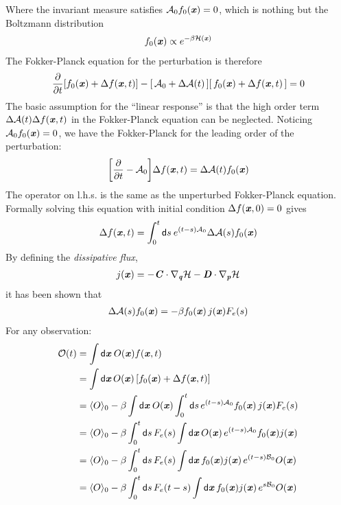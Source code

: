 \documentclass[aip,jcp,a4paper,reprint,onecolumn]{revtex4-1}
\newcommand{\vect}[1]{\textbf{\textit{#1}}}
\newcommand{\dd}{\textsf{d}}
\newcommand{\mh}{\mathcal H}
\newcommand{\fwg}{{\mathcal A}}
\newcommand{\bwg}{{\mathcal B}}
\begin{document}
Where the invariant measure satisfies $\fwg_0f_0(\vect x) = 0$,
which is nothing but the Boltzmann distribution
\begin{align}
  f_0(\vect x) \propto e^{-\beta\mh(\vect x)}
\end{align}
The Fokker-Planck equation for the perturbation is therefore
\begin{align}
  \frac{\partial}{\partial t}
  [f_0(\vect x) + \Delta  f(\vect x, t)]
  -
  [\,\fwg_0 + \Delta\fwg(t)\,]
  [\,f_0(\vect x) + \Delta  f(\vect x, t)\,] = 0
\end{align}
The basic assumption for the ``linear response'' is that the high order
term $\Delta\fwg(t)  \Delta  f(\vect x, t)$ in the Fokker-Planck equation
can be neglected. Noticing $\fwg_0 f_0(\vect x) = 0$, we have the
Fokker-Planck
for the leading order of the perturbation:
\begin{align}
  \bigg[
  \frac{\partial}{\partial t}
  - \fwg_0
  \bigg]
  \Delta  f(\vect x, t)
  =
  \Delta\fwg(t) f_0(\vect x)
\end{align}
The operator on l.h.s. is the same as the unperturbed Fokker-Planck equation.
Formally solving this equation with initial condition
$\Delta f(\vect x, 0) = 0$ gives
\begin{align}
  \Delta  f(\vect x, t) =
  \int_0^t \dd s \:
  e^{(t-s)\fwg_0}
  \Delta\fwg(s)f_0(\vect x)
\end{align}
By defining the \emph{dissipative flux},
\begin{align}
  j(\vect x) =
  -\vect C\cdot\nabla_{\vect q}\mh 
  -\vect D\cdot\nabla_{\vect p}\mh
\end{align}
it has been shown that %
\begin{align}
  \Delta\fwg(s)f_0(\vect x) =
  -\beta f_0(\vect x)\, j(\vect x) F_e(s)
\end{align}
For any observation:
\begin{align}\nonumber
  \mathcal O(t)
  &=
  \int\dd \vect x \:O(\vect x)f(\vect x, t)  \\\nonumber
  &=
  \int\dd \vect x\, O(\vect x)\,
  [f_0(\vect x) + \Delta f(\vect x, t)] \\\nonumber
  &=
  \langle O\rangle_0
  -
  \beta
  \int \dd \vect x\:
  O(\vect x)
  \int_0^t\dd s\,
  e^{(t-s)\fwg_0}
  f_0(\vect x)\, j(\vect x)F_e(s)  \\\nonumber
  &=
  \langle O\rangle_0
  -
  \beta
  \int_0^t\dd s\,
  F_e(s)
  \int \dd \vect x\,
  O(\vect x)\,
  e^{(t-s)\fwg_0}
  f_0(\vect x) j(\vect x)  \\
  &=
  \langle O\rangle_0
  -
  \beta
  \int_0^t\dd s\,
  F_e(s)
  \int \dd \vect x\,
  f_0(\vect x) j(\vect x)\,
  e^{(t-s)\bwg_0}
  O(\vect x)\\
  &=
  \langle O\rangle_0
  -
  \beta
  \int_0^t\dd s\,
  F_e(t-s)
  \int \dd \vect x\,
  f_0(\vect x) j(\vect x)\,
  e^{s\bwg_0}
  O(\vect x)
\end{align}
\end{document}
